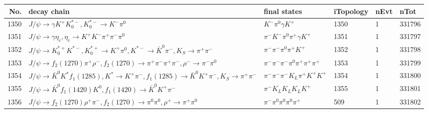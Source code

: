\begin{table}[htbp] 
\begin{center}
\begin{small}
\begin{tabular}{rlllll}\hline\hline
 No. & decay chain & final states &  iTopology & nEvt & nTot \\\hline
1350&$J/\psi       \rightarrow \gamma       K^{+}          K_{0}^{*-}     , K_{0}^{*-}      \rightarrow K^{-}          \pi^{0}        $&$K^{-}          \pi^{0}        \gamma       K^{+}          $& 1350&    1&331796\\
1351&$J/\psi       \rightarrow \gamma       \eta_{c}    , \eta_{c}     \rightarrow K^{+}          K^{-}          \pi^{+}        \pi^{-}        \pi^{0}        $&$\pi^{-}        K^{-}          \pi^{0}        \pi^{+}        \gamma       K^{+}          $& 1351&    1&331797\\
1352&$J/\psi       \rightarrow K_{0}^{*+}     K^{*-}         , K_{0}^{*+}      \rightarrow K^{+}          \pi^{0}        , K^{*-}          \rightarrow \bar{K}^{0}   \pi^{-}        , K_{S}           \rightarrow \pi^{+}        \pi^{-}        $&$\pi^{-}        \pi^{-}        \pi^{0}        \pi^{+}        K^{+}          $& 1352&    1&331798\\
1353&$J/\psi       \rightarrow f_{2}(1270)    \pi^{+}        \rho^{-}      , f_{2}(1270)     \rightarrow \pi^{+}        \pi^{-}        \pi^{+}        \pi^{-}        , \rho^{-}       \rightarrow \pi^{-}        \pi^{0}        $&$\pi^{-}        \pi^{-}        \pi^{-}        \pi^{0}        \pi^{+}        \pi^{+}        \pi^{+}        $& 1353&    1&331799\\
1354&$J/\psi       \rightarrow \bar{K}^{0}   K^{*}          f_{1}(1285)    , K^{*}           \rightarrow K^{+}          \pi^{-}        , f_{1}(1285)     \rightarrow \bar{K}^{0}   K^{+}          \pi^{-}        , K_{S}           \rightarrow \pi^{+}        \pi^{-}        $&$\pi^{-}        \pi^{-}        \pi^{-}        K_{L}          \pi^{+}        K^{+}          K^{+}          $& 1354&    1&331800\\
1355&$J/\psi       \rightarrow \bar{K}^{0}   f_{1}(1420)    K^{0}          , f_{1}(1420)     \rightarrow \bar{K}^{0}   K^{+}          \pi^{-}        $&$\pi^{-}        K_{L}          K_{L}          K_{L}          K^{+}          $& 1355&    1&331801\\
1356&$J/\psi       \rightarrow f_{2}(1270)    \rho^{+}      \pi^{-}        , f_{2}(1270)     \rightarrow \pi^{0}        \pi^{0}        , \rho^{+}       \rightarrow \pi^{+}        \pi^{0}        $&$\pi^{-}        \pi^{0}        \pi^{0}        \pi^{0}        \pi^{+}        $&  509&    1&331802\\

\end{tabular}
\end{small}
\end{center}
\end{table}
